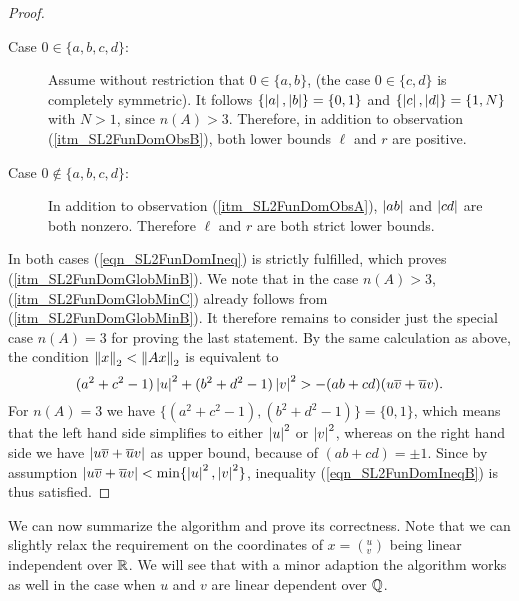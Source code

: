 \begin{proof}
\begin{description}
\item[Case $0 \in \{a,b,c,d\}$:] Assume without restriction that $0 \in \{a,b\}$, (the case $0 \in \{c,d\}$ is completely symmetric). It follows $\{\left|a\right|,\left|b\right|\} = \{0,1\}$ and $\{\left|c\right|,\left|d\right|\} = \{1,N\}$ with $N > 1$, since $n(A) > 3$. Therefore, in addition to observation (\ref{itm_SL2FunDomObsB}), both lower bounds $\ell$ and $r$ are positive. 
\item[Case $0 \notin \{a,b,c,d\}$:] In addition to observation (\ref{itm_SL2FunDomObsA}), $\left|ab\right|$ and $\left|cd\right|$ are both nonzero. Therefore $\ell$ and $r$ are both strict lower bounds.
\end{description}
In both cases (\ref{eqn_SL2FunDomIneq}) is strictly fulfilled, which proves (\ref{itm_SL2FunDomGlobMinB}). We note that in the case $n(A) > 3$, (\ref{itm_SL2FunDomGlobMinC}) already follows from (\ref{itm_SL2FunDomGlobMinB}). It therefore remains to consider just the special case $n(A) = 3$ for proving the last statement. By the same calculation as above, the condition $\left\| x \right\|_2 < \left\| Ax \right\|_2$ is equivalent to
\begin{equation}
\label{eqn_SL2FunDomIneqB}
(a^2 + c^2 - 1)\left|u\right|^2 + (b^2 + d^2 - 1)\left|v\right|^2 > -(ab + cd)(u\overline{v} + \overline{u}v).
\end{equation}
For $n(A) = 3$ we have $\{(a^2 + c^2 - 1),(b^2 + d^2 - 1)\} = \{0,1\}$, which means that the left hand side simplifies to either $\left|u\right|^2$ or $\left|v\right|^2$, whereas on the right hand side we have $\left|u\overline{v} + \overline{u}v\right|$ as upper bound, because of $(ab + cd) = \pm 1$. Since by assumption $\left|u\overline{v} + \overline{u}v\right| < \min\{\left|u\right|^2,\left|v\right|^2\}$, inequality (\ref{eqn_SL2FunDomIneqB}) is thus satisfied.
\end{proof}

We can now summarize the algorithm and prove its correctness. Note that we can slightly relax the requirement on the coordinates of $x = ({}^u_v)$ being linear independent over $\mathbb{R}$. We will see that with a minor adaption the algorithm works as well in the case when $u$ and $v$ are linear dependent over $\mathbb{Q}$.

